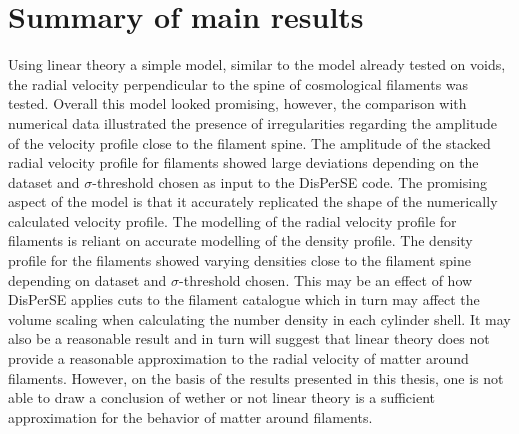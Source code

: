 \section{Summary of main results}\label{sec:mainresults}
Using linear theory a simple model, similar to the model already tested on voids, the radial velocity perpendicular to the spine of cosmological filaments was tested. Overall this model looked promising, however, the comparison with numerical data illustrated the presence of irregularities regarding the amplitude of the velocity profile close to the filament spine. The amplitude of the stacked radial velocity profile for filaments showed large deviations depending on the dataset and $\sigma$-threshold chosen as input to the DisPerSE code. The promising aspect of the model is that it accurately replicated the shape of the numerically calculated velocity profile. The modelling of the radial velocity profile for filaments is reliant on accurate modelling of the density profile. The density profile for the filaments showed varying densities close to the filament spine depending on dataset and $\sigma$-threshold chosen. This may be an effect of how DisPerSE applies cuts to the filament catalogue which in turn may affect the volume scaling when calculating the number density in each cylinder shell. It may also be a reasonable result and in turn will suggest that linear theory does not provide a reasonable approximation to the radial velocity of matter around filaments. However, on the basis of the results presented in this thesis, one is not able to draw a conclusion of wether or not linear theory is a sufficient approximation for the behavior of matter around filaments.\\\indent
